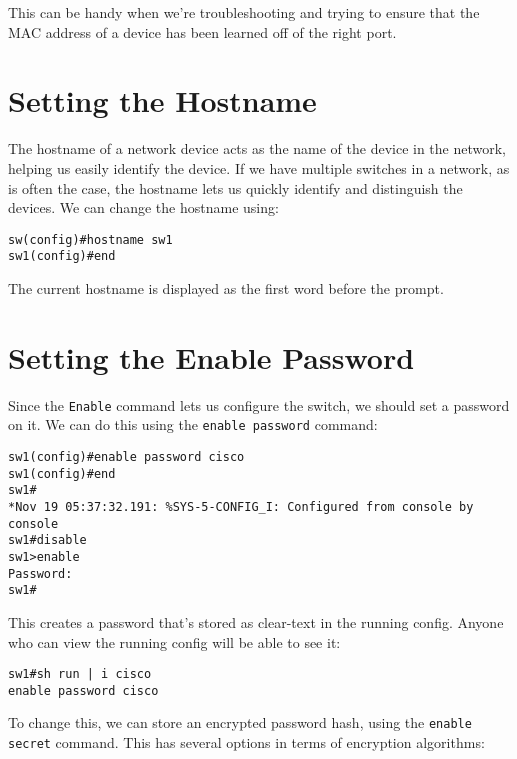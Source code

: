 \noindent
This can be handy when we're troubleshooting and trying to ensure that the MAC address of a device has been learned off of the right port. 

\section{Setting the Hostname}
The hostname of a network device acts as the name of the device in the network, helping us easily identify the device. If we have multiple switches in a network, as is often the case, the hostname lets us quickly identify and distinguish the devices. We can change the hostname using: 

\vspace{-15pt}
\begin{verbatim}
sw(config)#hostname sw1
sw1(config)#end
\end{verbatim}
\vspace{-10pt}

\noindent
The current hostname is displayed as the first word before the prompt.

\section{Setting the Enable Password} 
Since the \verb|Enable| command lets us configure the switch, we should set a password on it. We can do this using the \verb|enable password| command:

\vspace{-15pt}
\begin{verbatim}
sw1(config)#enable password cisco
sw1(config)#end
sw1#
*Nov 19 05:37:32.191: %SYS-5-CONFIG_I: Configured from console by console
sw1#disable
sw1>enable
Password:
sw1#
\end{verbatim}
\vspace{-10pt}

\noindent
This creates a password that's stored as clear-text in the running config. Anyone who can view the running config will be able to see it:

\vspace{-15pt}
\begin{verbatim}
sw1#sh run | i cisco
enable password cisco
\end{verbatim}
\vspace{-10pt}

\noindent
To change this, we can store an encrypted password hash, using the \verb|enable secret| command. This has several options in terms of encryption algorithms: 


